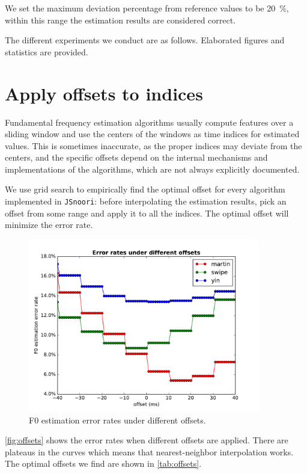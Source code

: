 \documentclass[11pt,a4paper]{report}
\begin{document}
We set the maximum deviation percentage from reference values to be \SI{20}{\percent}, within this range the estimation results are considered correct.

The different experiments we conduct are as follows.
Elaborated figures and statistics are provided.

\newpage

\section{Apply offsets to indices}

Fundamental frequency estimation algorithms usually compute features over a sliding window and use the centers of the windows as time indices for estimated values.
This is sometimes inaccurate, as the proper indices may deviate from the centers, and the specific offsets depend on the internal mechanisms and implementations of the algorithms, which are not always explicitly documented.

We use grid search to empirically find the optimal offset for every algorithm implemented in \texttt{JSnoori}: before interpolating the estimation results, pick an offset from some range and apply it to all the indices.
The optimal offset will minimize the error rate.

\begin{figure}[htbp]
  \centering
  \includegraphics[width=0.9\textwidth]{error_rates_vs_offsets.pdf}
  \caption{F0 estimation error rates under different offsets.} \label{fig:offsets}
\end{figure}

\autoref{fig:offsets} shows the error rates when different offsets are applied.
There are plateaus in the curves which means that nearest-neighbor interpolation works.
The optimal offsets we find are shown in \autoref{tab:offsets}.
\end{document}
